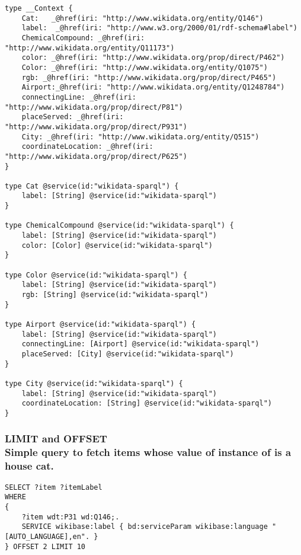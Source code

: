 \begin{minipage}{\linewidth}
\begin{lstlisting}[label=listing:listing34, caption={HyperGraphQL Annotated Scehma}]
type __Context {
    Cat:   _@href(iri: "http://www.wikidata.org/entity/Q146")
    label:  _@href(iri: "http://www.w3.org/2000/01/rdf-schema#label")
    ChemicalCompound: _@href(iri: "http://www.wikidata.org/entity/Q11173")
    color: _@href(iri: "http://www.wikidata.org/prop/direct/P462")
    Color: _@href(iri: "http://www.wikidata.org/entity/Q1075")
    rgb: _@href(iri: "http://www.wikidata.org/prop/direct/P465")
    Airport:_@href(iri: "http://www.wikidata.org/entity/Q1248784")
    connectingLine: _@href(iri: "http://www.wikidata.org/prop/direct/P81")
    placeServed: _@href(iri: "http://www.wikidata.org/prop/direct/P931")
    City: _@href(iri: "http://www.wikidata.org/entity/Q515")
    coordinateLocation: _@href(iri: "http://www.wikidata.org/prop/direct/P625")
}

type Cat @service(id:"wikidata-sparql") {
    label: [String] @service(id:"wikidata-sparql")
}

type ChemicalCompound @service(id:"wikidata-sparql") {
    label: [String] @service(id:"wikidata-sparql")
    color: [Color] @service(id:"wikidata-sparql")
}

type Color @service(id:"wikidata-sparql") {
    label: [String] @service(id:"wikidata-sparql")
    rgb: [String] @service(id:"wikidata-sparql")
}

type Airport @service(id:"wikidata-sparql") {
    label: [String] @service(id:"wikidata-sparql")
    connectingLine: [Airport] @service(id:"wikidata-sparql")
    placeServed: [City] @service(id:"wikidata-sparql")
}

type City @service(id:"wikidata-sparql") {
    label: [String] @service(id:"wikidata-sparql")
    coordinateLocation: [String] @service(id:"wikidata-sparql")
}
\end{lstlisting}
\end{minipage}

\subsubsection{LIMIT and OFFSET \\Simple query to fetch items whose value of instance of is a house cat.}

\begin{minipage}{\linewidth}
\begin{lstlisting}[label=listing:listing34, caption={Query 1}]
SELECT ?item ?itemLabel
WHERE
{
    ?item wdt:P31 wd:Q146;.
    SERVICE wikibase:label { bd:serviceParam wikibase:language "[AUTO_LANGUAGE],en". }
} OFFSET 2 LIMIT 10
\end{lstlisting}
\end{minipage}



